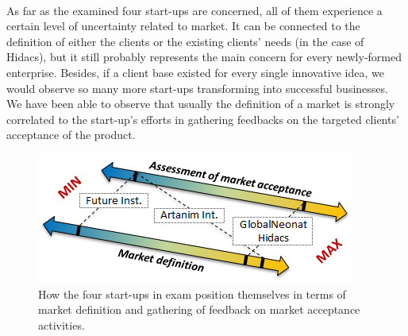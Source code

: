 \documentclass[twoside]{report}
\begin{document}
	\paragraph{}
	As far as the examined four start-ups are concerned, all of them experience a certain level of uncertainty related to market. It can be connected to the definition of either the clients or the existing clients' needs (in the case of Hidacs), but it still probably represents the main concern for every newly-formed enterprise. Besides, if a client base existed for every single innovative idea, we would observe so many more start-ups transforming into successful businesses. 
	We have been able to observe that usually the definition of a market is strongly correlated to the start-up's efforts in gathering feedbacks on the targeted clients' acceptance of the product.
	\begin{figure}
		\begin{center}
			\includegraphics{position.png}
			\caption{How the four start-ups in exam position themselves in terms of market definition and gathering of feedback on market acceptance activities.}
			\label{fig:position}
		\end{center}
	\end{figure}
\end{document}
